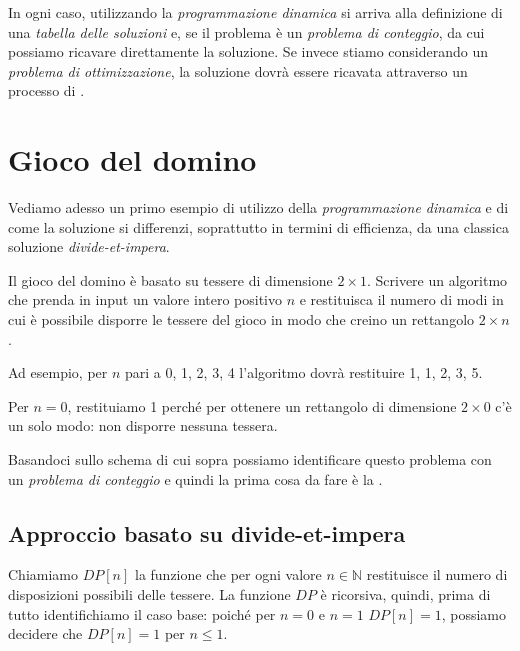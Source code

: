 In ogni caso, utilizzando la \emph{programmazione dinamica} si arriva alla
definizione di una \emph{tabella delle soluzioni} e, se il problema è un
\emph{problema di conteggio}, da cui possiamo ricavare direttamente la soluzione.
Se invece stiamo considerando un \emph{problema di ottimizzazione}, la
soluzione dovrà essere ricavata attraverso un processo di .

\section{Gioco del domino}
Vediamo adesso un primo esempio di utilizzo della \emph{programmazione dinamica}
e di come la soluzione si differenzi, soprattutto in termini di efficienza, da
una classica soluzione \emph{divide-et-impera}.

\begin{problem}
    Il gioco del domino è basato su tessere di dimensione $2\times1$. Scrivere un
    algoritmo che prenda in input un valore intero positivo $n$ e restituisca il
    numero di modi in cui è possibile disporre le tessere del gioco in modo che
    creino un rettangolo $2\times n$.
\end{problem}\noindent
Ad esempio, per $n$ pari a 0, 1, 2, 3, 4 l'algoritmo dovrà restituire 1, 1,
2, 3, 5.
\begin{note}
    Per $n=0$, restituiamo 1 perché per ottenere un rettangolo di dimensione
    $2\times 0$ c'è un solo modo: non disporre nessuna tessera.
\end{note}\noindent
Basandoci sullo schema di cui sopra possiamo identificare questo problema con
un \emph{problema di conteggio} e quindi la prima cosa da fare è la .

\subsection{Approccio basato su divide-et-impera}

Chiamiamo $DP[n]$ la funzione che per ogni valore $n\in\mathbb{N}$ restituisce il
numero di disposizioni possibili delle tessere. La funzione $DP$ è ricorsiva, quindi,
prima di tutto identifichiamo il caso base: poiché per $n=0$ e $n=1$ $DP[n]=1$,
possiamo decidere che $DP[n]=1$ per $n\leq1$.

